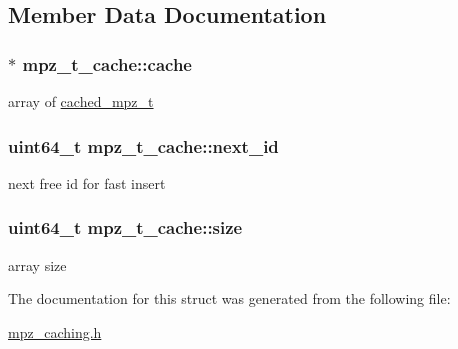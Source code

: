 \subsection{Member Data Documentation}
\subsubsection[{\texorpdfstring{cache}{cache}}]{$\ast$ mpz\+\_\+t\+\_\+cache\+::cache}\hypertarget{structmpz__t__cache_a68ba0b84ae67ae594f539b466dac5008}{}\label{structmpz__t__cache_a68ba0b84ae67ae594f539b466dac5008}
array of \hyperlink{structcached__mpz__t}{cached\+\_\+mpz\+\_\+t} 
\subsubsection[{\texorpdfstring{next\+\_\+id}{next_id}}]{\setlength{\rightskip}{0pt plus 5cm}uint64\+\_\+t mpz\+\_\+t\+\_\+cache\+::next\+\_\+id}\hypertarget{structmpz__t__cache_ad8f52046ab32c2b94ca4a32f22b4beb7}{}\label{structmpz__t__cache_ad8f52046ab32c2b94ca4a32f22b4beb7}
next free id for fast insert 
\subsubsection[{\texorpdfstring{size}{size}}]{\setlength{\rightskip}{0pt plus 5cm}uint64\+\_\+t mpz\+\_\+t\+\_\+cache\+::size}\hypertarget{structmpz__t__cache_a00982c72af6f0784f31c8d28bb56fbf8}{}\label{structmpz__t__cache_a00982c72af6f0784f31c8d28bb56fbf8}
array size 

The documentation for this struct was generated from the following file\+:\begin{DoxyCompactItemize}
\item 
\hyperlink{mpz__caching_8h}{mpz\+\_\+caching.\+h}\end{DoxyCompactItemize}

